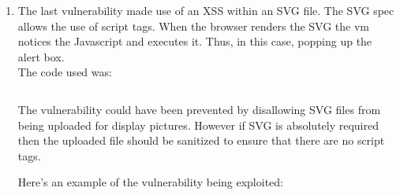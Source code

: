 \documentclass[fleqn, 12pt]{article}
\newcommand{\codefile}{\inputminted}
\begin{document}
\begin{enumerate}
    \item
        The last vulnerability made use of an XSS within an SVG file. The SVG spec allows the use of script tags. When the browser renders the SVG the vm notices the Javascript and executes it. Thus, in this case, popping up the alert box.\\

        The code used was:

        \codefile{xml}{../screenshots/6.svg}

        The vulnerability could have been prevented by disallowing SVG files from being uploaded for display pictures. However if SVG is absolutely required then the uploaded file should be sanitized to ensure that there are no script tags.\\

        \newpage

        Here's an example of the vulnerability being exploited:

\end{enumerate}
\end{document}
